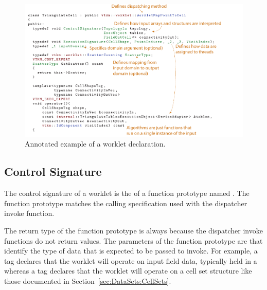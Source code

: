 

\begin{figure}[htb]
  \includegraphics[width=\linewidth]{images/WorkletExampleAnnotated}
  \caption{Annotated example of a worklet declaration.}
  \label{fig:WorkletExampleAnnotated}
\end{figure}

\subsection{Control Signature}
\label{sec:ControlSignature}


The control signature of a worklet is the  of a function
prototype named \controlsignature. The function prototype matches the
calling specification used with the dispatcher invoke function.

The return type of the function prototype is always  because
the dispatcher invoke functions do not return values. The parameters of the
function prototype are  that identify
the type of data that is expected to be passed to invoke. For example, a
 tag declares that the worklet will operate on input field
data, typically held in a  whereas a
 tag declares that the worklet will operate on a cell set
structure like those documented in Section~\ref{sec:DataSets:CellSets}.

